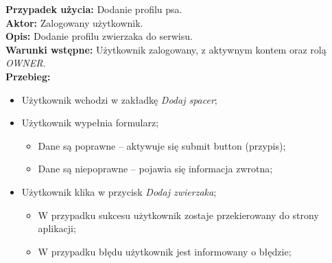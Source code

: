 
\noindent
\textbf{Przypadek użycia:} Dodanie profilu psa. \\
\textbf{Aktor:} Zalogowany użytkownik. \\
\textbf{Opis:} Dodanie profilu zwierzaka do serwisu. \\
\textbf{Warunki wstępne:} Użytkownik zalogowany, z aktywnym kontem oraz rolą \textit{OWNER}. \\
\textbf{Przebieg:}
\begin{itemize} 
    \item Użytkownik wchodzi w zakładkę \textit{Dodaj spacer};
    \item Użytkownik wypełnia formularz;
    \begin{itemize}
        \item Dane są poprawne -- aktywuje się submit button (przypis);
        \item Dane są niepoprawne -- pojawia się informacja zwrotna;
    \end{itemize}
    \item Użytkownik klika w przycisk \textit{Dodaj zwierzaka};
    \begin{itemize}
        \item W przypadku sukcesu użytkownik zostaje przekierowany do strony aplikacji;
        \item W przypadku błędu użytkownik jest informowany o błędzie;
    \end{itemize}
\end{itemize}

